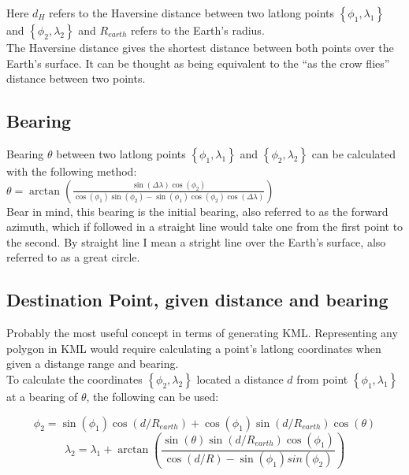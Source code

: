 Here $d_{H}$ refers to the Haversine distance between two latlong points $\left\{\phi_{1},\lambda_{1}\right\}$ and $\left\{\phi_{2},\lambda_{2}\right\}$ and $R_{earth}$ refers to the Earth's radius.\\

The Haversine distance gives the shortest distance between both points over the Earth's surface. It can be thought as being equivalent to the ``as the crow flies'' distance between two points.


\subsection{Bearing}

Bearing $\theta$ between two latlong points $\left\{\phi_{1},\lambda_{1}\right\}$ and $\left\{\phi_{2},\lambda_{2}\right\}$ can be calculated with the following method: \\
$
\theta = \arctan(\frac{\sin(\Delta \lambda) \cos(\phi_{2})}{\cos(\phi_{1}) \sin(\phi_{2}) - \sin(\phi_{1})\cos(\phi_{2}) \cos(\Delta \lambda)})
$
\\
Bear in mind, this bearing is the initial bearing, also referred to as the forward azimuth, which if followed in a straight line would take one from the first point to the second. By straight line I mean a stright line over the Earth's surface, also referred to as a great circle. \\

\subsection{Destination Point, given distance and bearing}

Probably the most useful concept in terms of generating KML. Representing any polygon in KML would require calculating a point's latlong coordinates when given a distange range and bearing. \\

To calculate the coordinates $\left\{ \phi_{2},\lambda_{2}\right\}$ located a distance $d$ from point $\left\{ \phi_{1},\lambda_{1}\right\}$ at a bearing of $\theta$, the following can be used:

\begin{equation}
  \phi_{2} = \sin(\phi_{1}) \cos(d/R_{earth}) + \cos(\phi_{1})\sin(d/R_{earth})\cos(\theta)
\end{equation}
\begin{equation}
  \lambda_{2} = \lambda_{1} + \arctan(\frac{\sin(\theta) \sin(d/R_{earth}) \cos(\phi_{1})}
                                         {\cos(d/R) - \sin(\phi_{1}) sin(\phi_{2})})
\end{equation}

